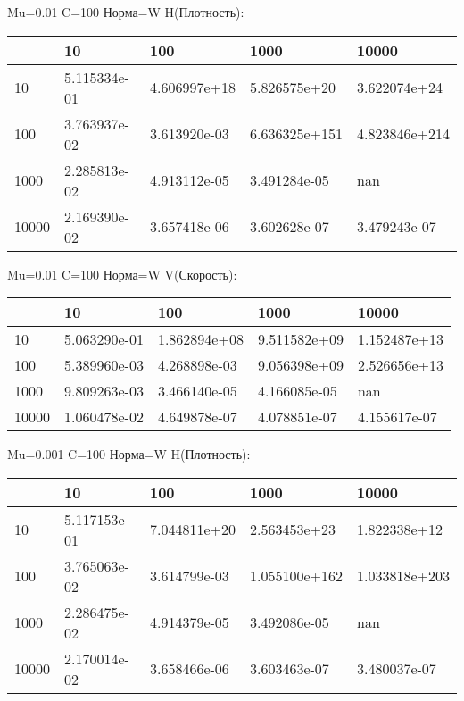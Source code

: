 \documentclass[a4paper, 12pt]{article}
\begin{document}
\bigskip
\bigskip
\bigskip


Mu=0.01  C=100 Норма=W H(Плотность):


\begin{tabular}{lllll}
\toprule
{} &         10    &         100   &          1000  &          10000 \\
\midrule
10    &  5.115334e-01 &  4.606997e+18 &   5.826575e+20 &   3.622074e+24 \\
100   &  3.763937e-02 &  3.613920e-03 &  6.636325e+151 &  4.823846e+214 \\
1000  &  2.285813e-02 &  4.913112e-05 &   3.491284e-05 &            nan \\
10000 &  2.169390e-02 &  3.657418e-06 &   3.602628e-07 &   3.479243e-07 \\
\bottomrule
\end{tabular}



\bigskip
\bigskip
\bigskip


Mu=0.01  C=100 Норма=W V(Скорость):


\begin{tabular}{lllll}
\toprule
{} &         10    &         100   &         1000  &         10000 \\
\midrule
10    &  5.063290e-01 &  1.862894e+08 &  9.511582e+09 &  1.152487e+13 \\
100   &  5.389960e-03 &  4.268898e-03 &  9.056398e+09 &  2.526656e+13 \\
1000  &  9.809263e-03 &  3.466140e-05 &  4.166085e-05 &           nan \\
10000 &  1.060478e-02 &  4.649878e-07 &  4.078851e-07 &  4.155617e-07 \\
\bottomrule
\end{tabular}



\bigskip
\bigskip
\bigskip


Mu=0.001  C=100 Норма=W H(Плотность):


\begin{tabular}{lllll}
\toprule
{} &         10    &         100   &          1000  &          10000 \\
\midrule
10    &  5.117153e-01 &  7.044811e+20 &   2.563453e+23 &   1.822338e+12 \\
100   &  3.765063e-02 &  3.614799e-03 &  1.055100e+162 &  1.033818e+203 \\
1000  &  2.286475e-02 &  4.914379e-05 &   3.492086e-05 &            nan \\
10000 &  2.170014e-02 &  3.658466e-06 &   3.603463e-07 &   3.480037e-07 \\
\bottomrule
\end{tabular}
\end{document}
